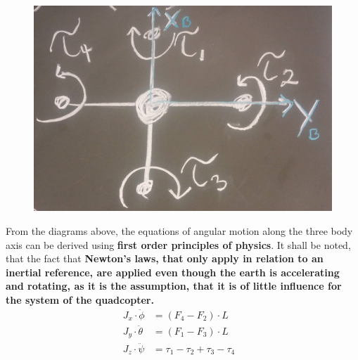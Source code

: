 \begin{minipage}{\linewidth}
\begin{minipage}{0.45\linewidth}
\begin{figure}[H]
			\label{fig:diagramQuad}
		\end{figure}
	\end{minipage}
	\hspace{0.03\linewidth}
	\begin{minipage}{0.45\linewidth}
		\begin{figure}[H] \vspace{16mm}
			\includegraphics[scale=.18]{figures/torques_diagram}
			\centering
			\label{fig:diagramTorque}
		\end{figure}
	\end{minipage}
\end{minipage}

From the diagrams above, the equations of angular motion along the three body axis can be derived using \textbf{first order principles of physics}. It shall be noted, that the fact that\textbf{ Newton's laws, that only apply in relation to an inertial reference, are applied even though the earth is accelerating and rotating, as it is the assumption, that it is of little influence for the system of the quadcopter. }
%
\begin{align}
	J_x\cdot\ddot{\phi}&=(F_4-F_2)\cdot L &\\
	J_y \cdot\ddot{\theta}&=(F_1-F_3)\cdot L &\\
	J_z\cdot\ddot{\psi}&=\tau_1-\tau_2+\tau_3-\tau_4
	\label{eq:AngleEq}
\end{align}

